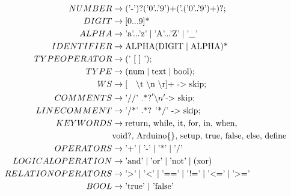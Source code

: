 \begin{align*}
    NUMBER                      & \to \text{('-')?('0'..'9')+('.('0'..'9')+)?;}                                                 \\
    DIGIT                       & \to \text{[0...9]*}                                                                           \\
    ALPHA                       & \to \text{'a'...'z'} \mid \text{'A'...'Z'} \mid \text{'\_'}                                   \\
    IDENTIFIER                  & \to \text{ALPHA(DIGIT} \mid \text{ALPHA)*}                                                    \\
    TYPEOPERATOR                & \to \text{(' [ ] ');}                                                                         \\
    TYPE                        & \to \text{(num} \mid \text{text} \mid \text{bool);}                                           \\ 
    WS                          & \to \text{[\quad \textbackslash t \textbackslash n \textbackslash r]+ -> skip;}               \\
    COMMENTS                    & \to \text{'//' .*?} '\backslash n' \text{-> skip;}                                            \\
    LINECOMMENT                 & \to \text{'/*' .*? '*/' -> skip;}                                                             \\
    KEYWORDS                    & \to \text{return, while, it, for, in, when,}                                                  \\
                                & \text{void?, Arduino\{\}, setup, true, false, else, define}                                   \\
    OPERATORS                   & \to \text{'+'} \mid \text{'-'} \mid \text{'*'} \mid \text{'/'}                                \\
    LOGICALOPERATION            & \to \text{'and'} \mid \text{'or'} \mid \text{'not'} \mid \text{(xor)}                         \\
    RELATIONOPERATORS           & \to \text{'>'} \mid \text{'<'} \mid \text{'=='} \mid \text{'!='} \mid \text{'<='} \mid \text{'>='} \\
    BOOL                        & \to \text{'true' | 'false'}                                                                   \\ 
\end{align*}
